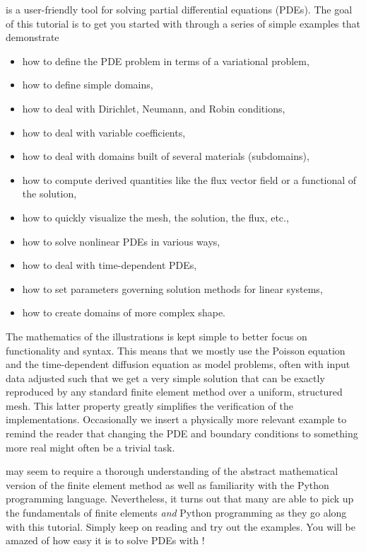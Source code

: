 \fenics{} is a user-friendly tool for solving partial differential
equations (PDEs). The goal of this tutorial is to get you started with
\fenics{} through a series of simple examples that demonstrate
\begin{itemize}
\item
how to define the PDE problem in terms of a variational problem,
\item
how to define simple domains,
\item
how to deal with Dirichlet, Neumann, and Robin conditions,
\item
how to deal with variable coefficients,
\item
how to deal with domains built of several materials (subdomains),
\item
how to compute derived quantities like the flux vector field or
a functional of the solution,
\item
how to quickly visualize the mesh, the solution, the flux, etc.,
\item
how to solve nonlinear PDEs in various ways,
\item
how to deal with time-dependent PDEs,
\item
how to set parameters governing solution methods for linear systems,
\item
how to create domains of more complex shape.
\end{itemize}
The mathematics of the illustrations is kept simple to better focus on
\fenics{} functionality and syntax. This means that we mostly use the
Poisson equation and the time-dependent diffusion equation as model
problems, often with input data adjusted such that we get a very
simple solution that can be exactly reproduced by any standard finite
element method over a uniform, structured mesh. This latter property
greatly simplifies the verification of the implementations.
Occasionally we insert a physically more relevant example to remind
the reader that changing the PDE and boundary conditions to something
more real might often be a trivial task.


\fenics{} may seem to require a thorough understanding of the abstract
mathematical version of the finite element method as well as
familiarity with the Python programming language.  Nevertheless, it
turns out that many are able to pick up the fundamentals of finite
elements \emph{and} Python programming as they go along with this
tutorial. Simply keep on reading and try out the examples. You will be
amazed of how easy it is to solve PDEs with \fenics{}!

